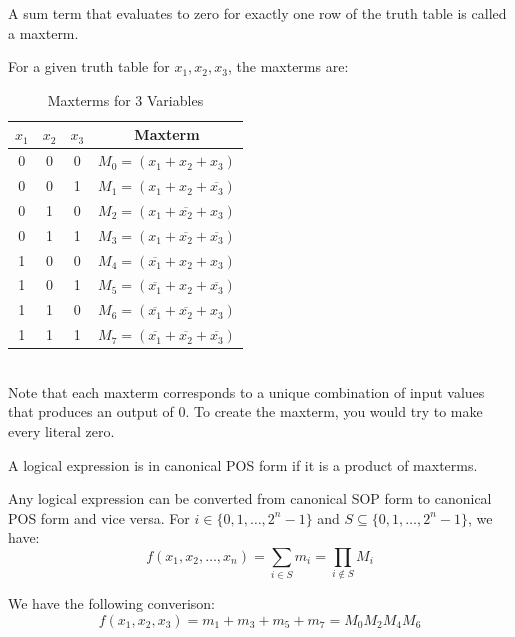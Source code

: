 \documentclass[11pt]{report}
\begin{document}
\begin{definition}[Maxterm]
    A sum term that evaluates to zero for exactly one row of the truth table is called a maxterm.
\end{definition}

\begin{example}[Maxterm]
    For a given truth table for $x_1, x_2, x_3$, the maxterms are:
    \begin{table}[h!]
        \centering
        \begin{tabular}{|c|c|c|c|}
            \hline
            $x_1$ & $x_2$ & $x_3$ & Maxterm \\
            \hline
            0 & 0 & 0 & $M_0 = (x_1 + x_2 + x_3)$ \\
            0 & 0 & 1 & $M_1 = (x_1 + x_2 + \overline{x_3})$ \\
            0 & 1 & 0 & $M_2 = (x_1 + \overline{x_2} + x_3)$ \\
            0 & 1 & 1 & $M_3 = (x_1 + \overline{x_2} + \overline{x_3})$ \\
            1 & 0 & 0 & $M_4 = (\overline{x_1} + x_2 + x_3)$ \\
            1 & 0 & 1 & $M_5 = (\overline{x_1} + x_2 + \overline{x_3})$ \\
            1 & 1 & 0 & $M_6 = (\overline{x_1} + \overline{x_2} + x_3)$ \\
            1 & 1 & 1 & $M_7 = (\overline{x_1} + \overline{x_2} + \overline{x_3})$ \\
            \hline
        \end{tabular}
        \caption{Maxterms for 3 Variables}
        \label{tab:maxterms}
    \end{table}
    \\
    Note that each maxterm corresponds to a unique combination of input values that produces an output of 0. To create the maxterm, you would try to make every literal zero.
\end{example}

\begin{definition}
    A logical expression is in canonical POS form if it is a product of maxterms.
\end{definition}

\begin{theorem}
    Any logical expression can be converted from canonical SOP form to canonical POS form and vice versa. For $i \in \{0, 1, \ldots, 2^n - 1\}$ and $S \subseteq \{0, 1, \ldots, 2^n - 1\}$, we have:
    \[
        f(x_1, x_2, \ldots, x_n) = \sum_{i \in S} m_i = \prod_{i \notin S} M_i
    \]
\end{theorem}
\begin{example}
    We have the following converison:
    $$
        f(x_1, x_2, x_3) = m_1 + m_3 + m_5 + m_7 = M_0 M_2 M_4 M_6
    $$
\end{example}
\end{document}

